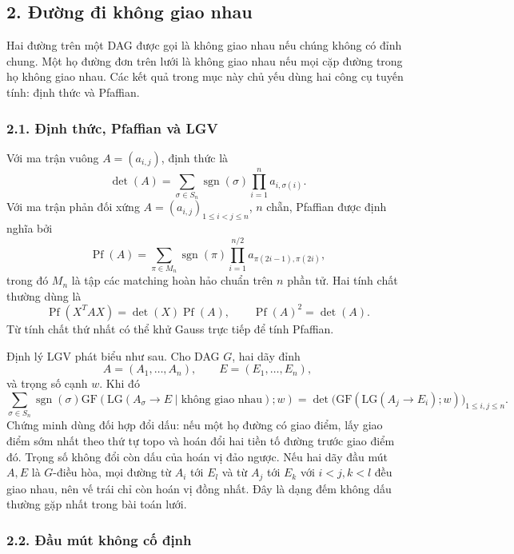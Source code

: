 \documentclass[11pt]{article}
\begin{document}
\subsection*{2. Đường đi không giao nhau}

Hai đường trên một DAG được gọi là không giao nhau nếu chúng không có đỉnh
chung. Một họ đường đơn trên lưới là không giao nhau nếu mọi cặp đường trong
họ không giao nhau. Các kết quả trong mục này chủ yếu dùng hai công cụ tuyến
tính: định thức và Pfaffian.

\subsubsection*{2.1. Định thức, Pfaffian và LGV}

Với ma trận vuông \(A=(a_{i,j})\), định thức là
\[
  \det(A)=\sum_{\sigma\in S_n}\operatorname{sgn}(\sigma)
  \prod_{i=1}^n a_{i,\sigma(i)}.
\]
Với ma trận phản đối xứng \(A=(a_{i,j})_{1\le i<j\le n}\), \(n\) chẵn,
Pfaffian được định nghĩa bởi
\[
  \operatorname{Pf}(A)=
  \sum_{\pi\in M_n}\operatorname{sgn}(\pi)
  \prod_{i=1}^{n/2} a_{\pi(2i-1),\pi(2i)},
\]
trong đó \(M_n\) là tập các matching hoàn hảo chuẩn trên \(n\) phần tử. Hai
tính chất thường dùng là
\[
  \operatorname{Pf}(X^TAX)=\det(X)\operatorname{Pf}(A),\qquad
  \operatorname{Pf}(A)^2=\det(A).
\]
Từ tính chất thứ nhất có thể khử Gauss trực tiếp để tính Pfaffian.

Định lý LGV phát biểu như sau. Cho DAG \(G\), hai dãy đỉnh
\[
  A=(A_1,\ldots,A_n),\qquad E=(E_1,\ldots,E_n),
\]
và trọng số cạnh \(w\). Khi đó
\[
  \sum_{\sigma\in S_n}\operatorname{sgn}(\sigma)
  \mathrm{GF}(\mathrm{LG}(A_\sigma\to E\mid\text{không giao nhau});w)
  =
  \det\bigl(\mathrm{GF}(\mathrm{LG}(A_j\to E_i);w)\bigr)_{1\le i,j\le n}.
\]
Chứng minh dùng đối hợp đổi dấu: nếu một họ đường có giao điểm, lấy giao điểm
sớm nhất theo thứ tự topo và hoán đổi hai tiền tố đường trước giao điểm đó.
Trọng số không đổi còn dấu của hoán vị đảo ngược. Nếu hai dãy đầu mút
\(A,E\) là \(G\)-điều hòa, mọi đường từ \(A_i\) tới \(E_l\) và từ \(A_j\) tới
\(E_k\) với \(i<j,k<l\) đều giao nhau, nên vế trái chỉ còn hoán vị đồng nhất.
Đây là dạng đếm không dấu thường gặp nhất trong bài toán lưới.


\subsubsection*{2.2. Đầu mút không cố định}
\end{document}
